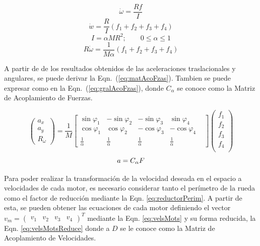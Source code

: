 \documentclass[twocolumn,10pt]{amrob}
\begin{document}
\begin{equation}
  \dot{\omega} = \frac{Rf}{I} \label{eq:omegaGral} 
\end{equation}
\begin{equation}
  \dot{w} =\frac{R}{I}\left(f_1+f_2+f_3+f_4\right) \label{eq:omega4Mots}
\end{equation}
\begin{equation}
  I = \alpha M R^{2} ;\qquad 0\leq \alpha \leq1 \label{eq:inercia}
\end{equation}
\begin{equation}
  R\dot{\omega} = \frac{1}{M\alpha}\left(f_1+f_2+f_3+f_4\right) \label{eq:Romega}
\end{equation}

A partir de de los resultados obtenidos de las aceleraciones traslacionales y angulares, se puede derivar la Eqn.~(\ref{eq:matAcoFzas}). Tambien se puede expresar como en la Eqn.~(\ref{eq:gralAcoFzas}), donde \( C_\alpha \) se conoce como la Matriz de Acoplamiento de Fuerzas. \par

\begin{equation}
  \left(\begin{array}{c}
    a_x \\ a_y \\R_{\dot{\omega}}
  \end{array}\right)= \frac{1}{M}
  \begin{bmatrix}
    \sin\varphi_1 & -\sin\varphi_2 & -\sin\varphi_3 & \sin\varphi_4 \\
    \cos\varphi_1 & \cos\varphi_2 & -\cos\varphi_3 & -\cos\varphi_4 & \\
    \frac{1}{\alpha} & \frac{1}{\alpha}  & \frac{1}{\alpha}  &\frac{1}{\alpha} 
  \end{bmatrix}
  \left(\begin{array}{c}
    f_1 \\ f_2 \\ f_3 \\ f_4  \label{eq:matAcoFzas}\\ 
  \end{array}\right) 
\end{equation}
\begin{equation}
  a=C_\alpha F \label{eq:gralAcoFzas} \\
\end{equation}

Para poder realizar la transformación de la velocidad deseada en el espacio a velocidades de cada motor, es necesario considerar tanto el perímetro de la rueda como el factor de reducción mediante la Eqn. \eqref{eq:reductorPerim}. A partir de esta, se pueden obtener las ecuaciones de cada motor definiendo el vector \( v_m = \begin{pmatrix}v_1 & v_2 & v_3 & v_4\end{pmatrix} ^{T}\) mediante la Eqn. \eqref{eq:velsMots}  y su forma reducida, la Eqn. \eqref{eq:velsMotsReduce} donde a \( D \) se le conoce como la Matriz de Acoplamiento de Velocidades. \par 
\end{document}

